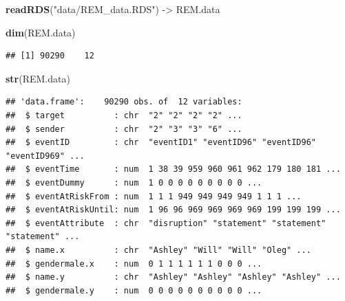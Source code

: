 \documentclass[
]{article}
\newenvironment{Shaded}{\begin{snugshade}}{\end{snugshade}}
\newcommand{\AttributeTok}[1]{\textcolor[rgb]{0.13,0.29,0.53}{#1}}
\newcommand{\FunctionTok}[1]{\textcolor[rgb]{0.13,0.29,0.53}{\textbf{#1}}}
\newcommand{\NormalTok}[1]{#1}
\newcommand{\OtherTok}[1]{\textcolor[rgb]{0.56,0.35,0.01}{#1}}
\newcommand{\SpecialCharTok}[1]{\textcolor[rgb]{0.81,0.36,0.00}{\textbf{#1}}}
\newcommand{\StringTok}[1]{\textcolor[rgb]{0.31,0.60,0.02}{#1}}
\begin{document}
\begin{Shaded}
\begin{Highlighting}[]
\FunctionTok{readRDS}\NormalTok{(}\StringTok{"data/REM\_data.RDS"}\NormalTok{) }\OtherTok{{-}\textgreater{}}\NormalTok{ REM.data}
\end{Highlighting}
\end{Shaded}

\begin{Shaded}
\begin{Highlighting}[]
\FunctionTok{dim}\NormalTok{(REM.data)}
\end{Highlighting}
\end{Shaded}

\begin{verbatim}
## [1] 90290    12
\end{verbatim}

\begin{Shaded}
\begin{Highlighting}[]
\FunctionTok{str}\NormalTok{(REM.data)}
\end{Highlighting}
\end{Shaded}

\begin{verbatim}
## 'data.frame':    90290 obs. of  12 variables:
##  $ target          : chr  "2" "2" "2" "2" ...
##  $ sender          : chr  "2" "3" "3" "6" ...
##  $ eventID         : chr  "eventID1" "eventID96" "eventID96" "eventID969" ...
##  $ eventTime       : num  1 38 39 959 960 961 962 179 180 181 ...
##  $ eventDummy      : num  1 0 0 0 0 0 0 0 0 0 ...
##  $ eventAtRiskFrom : num  1 1 1 949 949 949 949 1 1 1 ...
##  $ eventAtRiskUntil: num  1 96 96 969 969 969 969 199 199 199 ...
##  $ eventAttribute  : chr  "disruption" "statement" "statement" "statement" ...
##  $ name.x          : chr  "Ashley" "Will" "Will" "Oleg" ...
##  $ gendermale.x    : num  0 1 1 1 1 1 1 0 0 0 ...
##  $ name.y          : chr  "Ashley" "Ashley" "Ashley" "Ashley" ...
##  $ gendermale.y    : num  0 0 0 0 0 0 0 0 0 0 ...
\end{verbatim}

\begin{Shaded}
\end{Shaded}
\end{document}

